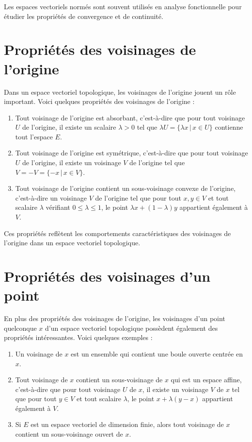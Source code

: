 \documentclass{article}
\begin{document}
Les espaces vectoriels normés sont souvent utilisés en analyse fonctionnelle pour étudier les propriétés de convergence et de continuité.

\section{Propriétés des voisinages de l'origine}

Dans un espace vectoriel topologique, les voisinages de l'origine jouent un rôle important. Voici quelques propriétés des voisinages de l'origine :

\begin{enumerate}
    \item Tout voisinage de l'origine est absorbant, c'est-à-dire que pour tout voisinage $U$ de l'origine, il existe un scalaire $\lambda > 0$ tel que $\lambda U = \{ \lambda x \,|\, x \in U \}$ contienne tout l'espace $E$.
    
    \item Tout voisinage de l'origine est symétrique, c'est-à-dire que pour tout voisinage $U$ de l'origine, il existe un voisinage $V$ de l'origine tel que $V = -V = \{-x \,|\, x \in V\}$.
    
    \item Tout voisinage de l'origine contient un sous-voisinage convexe de l'origine, c'est-à-dire un voisinage $V$ de l'origine tel que pour tout $x, y \in V$ et tout scalaire $\lambda$ vérifiant $0 \leq \lambda \leq 1$, le point $\lambda x + (1-\lambda)y$ appartient également à $V$.
\end{enumerate}

Ces propriétés reflètent les comportements caractéristiques des voisinages de l'origine dans un espace vectoriel topologique.

\section{Propriétés des voisinages d'un point}

En plus des propriétés des voisinages de l'origine, les voisinages d'un point quelconque $x$ d'un espace vectoriel topologique possèdent également des propriétés intéressantes. Voici quelques exemples :

\begin{enumerate}
    \item Un voisinage de $x$ est un ensemble qui contient une boule ouverte centrée en $x$.
    
    \item Tout voisinage de $x$ contient un sous-voisinage de $x$ qui est un espace affine, c'est-à-dire que pour tout voisinage $U$ de $x$, il existe un voisinage $V$ de $x$ tel que pour tout $y \in V$ et tout scalaire $\lambda$, le point $x + \lambda(y - x)$ appartient également à $V$.
    
    \item Si $E$ est un espace vectoriel de dimension finie, alors tout voisinage de $x$ contient un sous-voisinage ouvert de $x$.
\end{enumerate}
\end{document}
